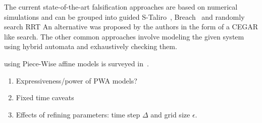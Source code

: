  The current
state-of-the-art falsification approaches are based on numerical
simulations and can be grouped into guided
S-Taliro~\cite{annpureddy2011s}, Breach~\cite{donze2010breach}
and randomly search RRT
An alternative was proposed by the authors in the form of a CEGAR
like search.
The other common approaches involve modeling the given system using
hybrid automata and exhaustively checking them.


 using Piece-Wise affine
models is surveyed in~\cite{paoletti2007identification}.
\begin{enumerate}
\item Expressiveness/power of PWA models?
\item Fixed time caveats
\item Effects of refining parameters: time step $\Delta$ and grid size $\epsilon$.
\end{enumerate}


